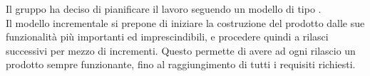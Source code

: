 Il gruppo \Gruppo{} ha deciso di pianificare il lavoro seguendo un modello di tipo \textbf {}. \\
Il modello incrementale si prepone di iniziare la costruzione del prodotto dalle sue funzionalità più importanti ed imprescindibili, e procedere quindi a rilasci successivi per mezzo di incrementi. Questo permette di avere ad ogni rilascio un prodotto sempre funzionante, fino al raggiungimento di tutti i requisiti richiesti.